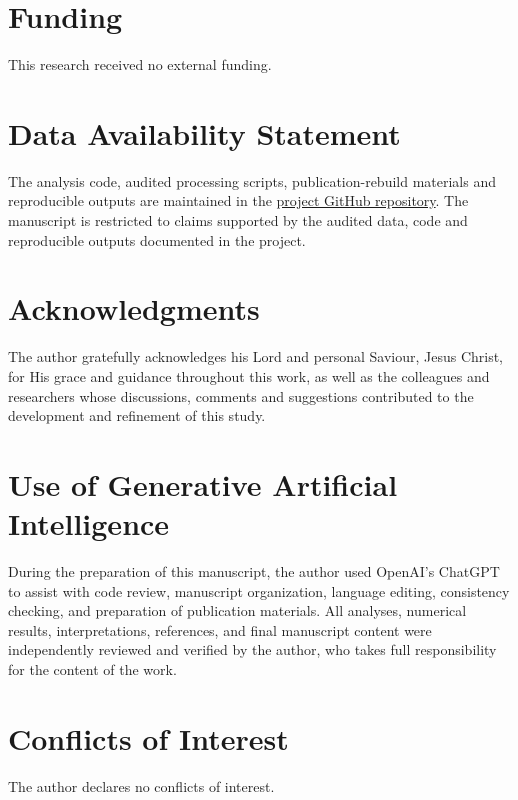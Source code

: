 \documentclass[11pt]{article}
\begin{document}
\section*{Funding}
This research received no external funding.

\section*{Data Availability Statement}
The analysis code, audited processing scripts, publication-rebuild materials and reproducible outputs are maintained in the \href{https://github.com/Jonathanerrils/tail-dependence-ghana}{project GitHub repository}. The manuscript is restricted to claims supported by the audited data, code and reproducible outputs documented in the project.

\section*{Acknowledgments}
The author gratefully acknowledges his Lord and personal Saviour, Jesus Christ, for His grace and guidance throughout this work, as well as the colleagues and researchers whose discussions, comments and suggestions contributed to the development and refinement of this study.

\section*{Use of Generative Artificial Intelligence}
During the preparation of this manuscript, the author used OpenAI's ChatGPT to assist with code review, manuscript organization, language editing, consistency checking, and preparation of publication materials. All analyses, numerical results, interpretations, references, and final manuscript content were independently reviewed and verified by the author, who takes full responsibility for the content of the work.

\section*{Conflicts of Interest}
The author declares no conflicts of interest.




\end{document}
